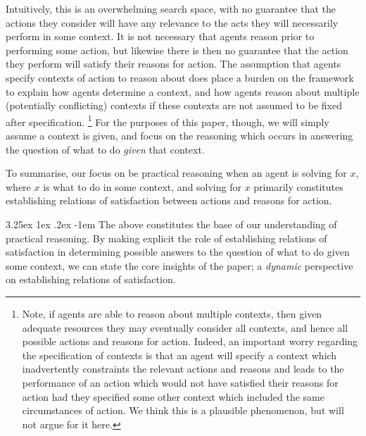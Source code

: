 \documentclass[10pt]{article}
\makeatletter
\renewcommand\paragraph{\@startsection{paragraph}{5}{\z@}%
  {3.25ex \@plus1ex \@minus.2ex}%
  {-1em}%
  {\normalfont\normalsize\bfseries}}
\makeatother
\begin{document}
Intuitively, this is an overwhelming search space, with no guarantee that the actions they consider will have any relevance to the acts they will necessarily perform in some context.
It is not necessary that agents reason prior to performing some action, but likewise there is then no guarantee that the action they perform will satisfy their reasons for action.
The assumption that agents specify contexts of action to reason about does place a burden on the framework to explain how agents determine a context, and how agents reason about multiple (potentially conflicting) contexts if these contexts are not assumed to be fixed after specification.\nolinebreak
\footnote{Note, if agents are able to reason about multiple contexts, then given adequate resources they may eventually consider all contexts, and hence all possible actions and reasons for action.
  Indeed, an important worry regarding the specification of contexts is that an agent will specify a context which inadvertently constraints the relevant actions and reasons and leads to the performance of an action which would not have satisfied their reasons for action had they specified some other context which included the same circumstances of action.
  We think this is a plausible phenomenon, but will not argue for it here.}
For the purposes of this paper, though, we will simply assume a context is given, and focus on the reasoning which occurs in answering the question of what to do \emph{given} that context.

To summarise, our focus on be practical reasoning when an agent is solving for \(x\), where \(x\) is what to do in some context, and solving for \(x\) primarily constitutes establishing relations of satisfaction between actions and reasons for action.

\paragraph{ }%
The above constitutes the base of our understanding of practical reasoning.
By making explicit the role of establishing relations of satisfaction in determining possible answers to the question of what to do given some context, we can state the core insights of the paper; a \emph{dynamic} perspective on establishing relations of satisfaction.
\end{document}
